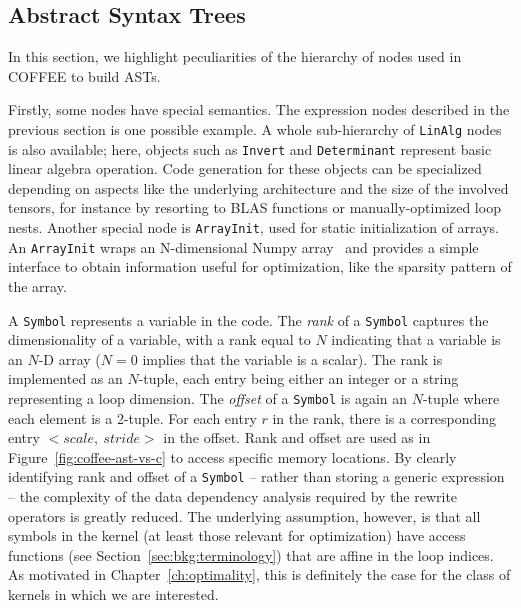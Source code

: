 \subsection{Abstract Syntax Trees}
In this section, we highlight peculiarities of the hierarchy of nodes used in COFFEE to build ASTs.

Firstly, some nodes have special semantics. The expression nodes described in the previous section is one possible example. A whole sub-hierarchy of \texttt{LinAlg} nodes is also available; here, objects such as \texttt{Invert} and \texttt{Determinant} represent basic linear algebra operation. Code generation for these objects can be specialized depending on aspects like the underlying architecture and the size of the involved tensors, for instance by resorting to BLAS functions or manually-optimized loop nests. Another special node is \texttt{ArrayInit}, used for static initialization of arrays. An \texttt{ArrayInit} wraps an N-dimensional Numpy array~\cite{Numpy} and provides a simple interface to obtain information useful for optimization, like the sparsity pattern of the array. 

A \texttt{Symbol} represents a variable in the code. The \textit{rank} of a \texttt{Symbol} captures the dimensionality of a variable, with a rank equal to $N$ indicating that a variable is an $N$-D array ($N=0$ implies that the variable is a scalar). The rank is implemented as an $N$-tuple, each entry being either an integer or a string representing a loop dimension. The \textit{offset} of a \texttt{Symbol} is again an $N$-tuple where each element is a 2-tuple. For each entry $r$ in the rank, there is a corresponding entry ${<}scale,\ stride{>}$ in the offset. Rank and offset are used as in Figure~\ref{fig:coffee-ast-vs-c} to access specific memory locations. By clearly identifying rank and offset of a \texttt{Symbol} -- rather than storing a generic expression -- the complexity of the data dependency analysis required by the rewrite operators is greatly reduced. The underlying assumption, however, is that all symbols in the kernel (at least those relevant for optimization) have access functions (see Section~\ref{sec:bkg:terminology}) that are affine in the loop indices. As motivated in Chapter~\ref{ch:optimality}, this is definitely the case for the class of kernels in which we are interested.

